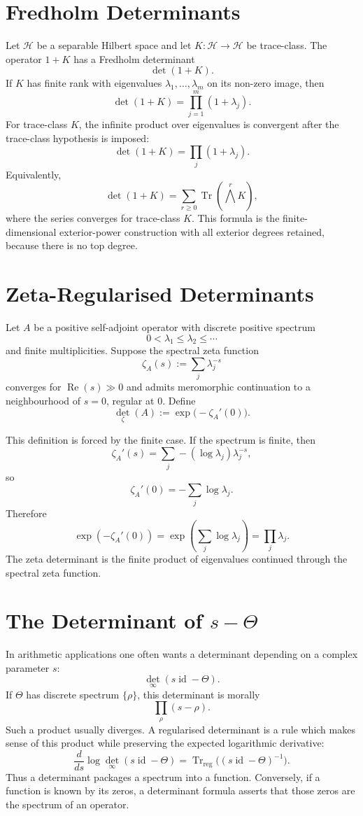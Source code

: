 \documentclass[11pt]{memoir}
\newcommand{\Tr}{\operatorname{Tr}}
\newcommand{\id}{\operatorname{id}}
\newcommand{\cH}{\mathcal{H}}
\begin{document}
\section{Fredholm Determinants}
\label{sec:fredholm}

Let \(\cH\) be a separable Hilbert space and let \(K:\cH\to\cH\) be
trace-class. The operator \(1+K\) has a Fredholm determinant
\[
  \det(1+K).
\]
If \(K\) has finite rank with eigenvalues \(\lambda_1,\dots,\lambda_m\)
on its non-zero image, then
\[
  \det(1+K)=\prod_{j=1}^{m}(1+\lambda_j).
\]
For trace-class \(K\), the infinite product over eigenvalues is
convergent after the trace-class hypothesis is imposed:
\[
  \det(1+K)=\prod_j(1+\lambda_j).
\]
Equivalently,
\[
  \det(1+K)
  =
  \sum_{r\geq0}\Tr\left(\bigwedge^rK\right),
\]
where the series converges for trace-class \(K\). This formula is the
finite-dimensional exterior-power construction with all exterior
degrees retained, because there is no top degree.

\section{Zeta-Regularised Determinants}
\label{sec:zeta-det}

Let \(A\) be a positive self-adjoint operator with discrete positive
spectrum
\[
  0<\lambda_1\leq\lambda_2\leq\cdots
\]
and finite multiplicities. Suppose the spectral zeta function
\[
  \zeta_A(s):=\sum_j\lambda_j^{-s}
\]
converges for \(\operatorname{Re}(s)\gg0\) and admits meromorphic
continuation to a neighbourhood of \(s=0\), regular at \(0\). Define
\[
  \det_\zeta(A):=\exp\bigl(-\zeta_A'(0)\bigr).
\]

This definition is forced by the finite case. If the spectrum is
finite, then
\[
  \zeta_A'(s)=\sum_j -(\log\lambda_j)\lambda_j^{-s},
\]
so
\[
  \zeta_A'(0)=-\sum_j\log\lambda_j.
\]
Therefore
\[
  \exp(-\zeta_A'(0))
  =
  \exp\left(\sum_j\log\lambda_j\right)
  =
  \prod_j\lambda_j.
\]
The zeta determinant is the finite product of eigenvalues continued
through the spectral zeta function.

\section{\texorpdfstring{The Determinant of \(s-\Theta\)}{The Determinant of s-Theta}}
\label{sec:s-minus-theta}

In arithmetic applications one often wants a determinant depending on
a complex parameter \(s\):
\[
  \det_\infty(s\id-\Theta).
\]
If \(\Theta\) has discrete spectrum \(\{\rho\}\), this determinant is
morally
\[
  \prod_\rho(s-\rho).
\]
Such a product usually diverges. A regularised determinant is a rule
which makes sense of this product while preserving the expected
logarithmic derivative:
\[
  \frac{d}{ds}\log\det_\infty(s\id-\Theta)
  =
  \Tr_{\mathrm{reg}}\bigl((s\id-\Theta)^{-1}\bigr).
\]
Thus a determinant packages a spectrum into a function. Conversely,
if a function is known by its zeros, a determinant formula asserts
that those zeros are the spectrum of an operator.
\end{document}
